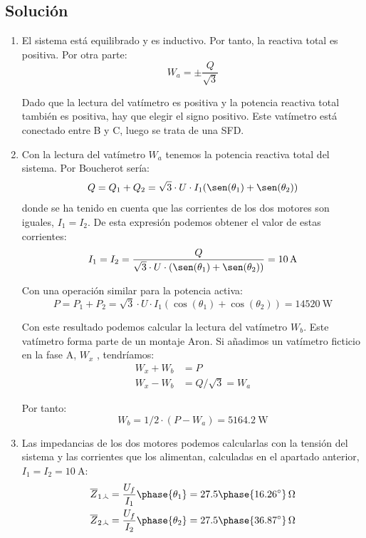 \subsection*{Solución}

\begin{enumerate}
\item El sistema está equilibrado y es inductivo. Por tanto, la reactiva total es positiva. Por otra parte:
  \[
    W_a = \pm \frac{Q}{\sqrt{3}}
  \]

  Dado que la lectura del vatímetro es positiva y la potencia reactiva total también es positiva, hay que elegir el signo positivo. Este vatímetro está conectado entre B y C, luego se trata de una SFD.
  
\item Con la lectura del vatímetro $W_a$ tenemos la potencia reactiva total del sistema. Por Boucherot sería:
  \[
    Q = Q_1 + Q_2 = \sqrt{3} \cdot U \cdot I_1 (\sen(\theta_1) + \sen(\theta_2))
  \]
  donde se ha tenido en cuenta que las corrientes de los dos motores son iguales, $I_1 = I_2$. De esta expresión podemos obtener el valor de estas corrientes:
  \[
    I_1 = I_2 = \frac{Q}{\sqrt{3} \cdot U \cdot (\sen(\theta_1) + \sen(\theta_2))} = \qty{10}{\ampere}
  \]

  Con una operación similar para la potencia activa:
  \[
    P = P_1 + P_2 = \sqrt{3} \cdot U \cdot I_1 (\cos(\theta_1) + \cos(\theta_2)) = \qty{14520}{\watt}
  \]

  Con este resultado podemos calcular la lectura del vatímetro $W_b$. Este vatímetro forma parte de un montaje Aron. Si añadimos un vatímetro ficticio en la fase A, $W_x$ , tendríamos:
  \begin{align*}
    W_x + W_b &= P\\
    W_x - W_b &= Q/\sqrt{3} = W_a
  \end{align*}

  Por tanto:
  \[
    W_b = 1/2 \cdot (P - W_a) = \qty{5164.2}{\watt}
  \]
  
\item Las impedancias de los dos motores podemos calcularlas con la tensión del sistema y las corrientes que los alimentan, calculadas en el apartado anterior, $I_1 = I_2 = \qty{10}{\ampere}$:
    \begin{align*}
      \overline{Z}_{1\wye} &= \frac{U_f}{I_1}\phase{\theta_1} = 27.5\phase{\ang{16.26}}\,\unit{\ohm}\\
      \overline{Z}_{2\wye} &= \frac{U_f}{I_2}\phase{\theta_2} = 27.5\phase{\ang{36.87}}\,\unit{\ohm}
  \end{align*}


\end{enumerate}
